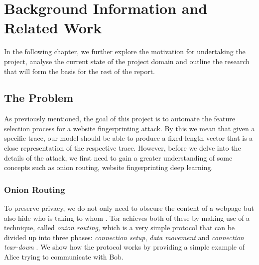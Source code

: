 \chapter{Background Information and Related Work}
In the following chapter, we further explore the motivation for undertaking the project,
analyse the current state of the project domain and outline the research that will form the basis for the rest of the report.

\section{The Problem}
As previously mentioned, the goal of this project is to automate the feature selection process for a website fingerprinting attack.
By this we mean that given a specific trace, our model should be able to produce a fixed-length vector that is a close representation of the respective trace.
However, before we delve into the details of the attack, we first need to gain a greater understanding of some concepts such as
onion routing, website fingerprinting deep learning.

\subsection{Onion Routing}
To preserve privacy, we do not only need to obscure the content of a webpage but also hide who is taking to whom \cite{goldschlag1999onion}.
Tor achieves both of these by making use of a technique, called \textit{onion routing}, which is a very simple protocol that can be divided up into three phases:
\textit{connection setup}, \textit{data movement} and \textit{connection tear-down} \cite{goldschlag1999onion}.
We show how the protocol works by providing a simple example of Alice trying to communicate with Bob.

